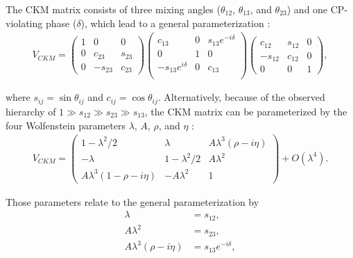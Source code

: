 
The CKM matrix consists of three mixing angles ($\theta_{12}$, $\theta_{13}$, and $\theta_{23}$) and one CP-violating phase ($\delta$), which lead to a general parameterization \parencite{CKM_general}:
%
\vspace{1em}
\begin{align}
V_{CKM}
=
\begin{pmatrix}
1 & 0 & 0 \\
0 & c_{23} & s_{23} \\
0 & -s_{23} & c_{23} 
\end{pmatrix}
\begin{pmatrix}
c_{13} & 0 & s_{13}e^{-i \delta} \\
0 & 1 & 0 \\
-s_{13}e^{i \delta} & 0 & c_{13} \\
\end{pmatrix}
\begin{pmatrix}
c_{12} & s_{12} & 0 \\
-s_{12} & c_{12} & 0 \\
0 & 0 & 1
\end{pmatrix}
,
\end{align}

\noindent
where $s_{ij} = \sin{\theta_{ij}}$ and $c_{ij} = \cos{\theta_{ij}}$. Alternatively, because of the observed hierarchy of ${1 \gg s_{12} \gg s_{23} \gg s_{13}}$, the CKM matrix can be parameterized by the four Wolfenstein parameters $\lambda$, $A$, $\rho$, and $\eta$ \parencite{CKM_wolfenstein}:
%
\vspace{1em}
\begin{align}
V_{CKM}
=
\begin{pmatrix}
1 - \lambda^2/2 & \lambda           & A \lambda^3 (\rho - i \eta) \\
-\lambda        & 1 - \lambda^2/2   & A \lambda^2                 \\
A \lambda^3(1-\rho-i \eta) & -A \lambda^2 & 1
\end{pmatrix}
+
O(\lambda^4)
.
\label{eq:wolfenstein}
\end{align}

\noindent
Those parameters relate to the general parameterization by
\vspace{1em}
\begin{align*}
\lambda &= s_{12} , \\
A \lambda^2 &= s_{23} , \\
A \lambda^3 ( \rho - i \eta ) &= s_{13} e^{-i \delta},
\end{align*}

